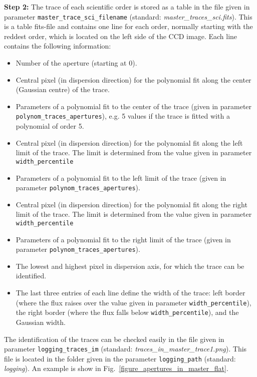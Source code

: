 \documentclass[10pt,a4paper]{article}
\begin{document}
\vspace{0.5em}\noindent \textbf{Step 2:} The trace of each scientific order is stored as a table in the file given in parameter \verb|master_trace_sci_filename| (standard: \textit{master\_traces\_sci.fits}). This is a table fits-file and contains one line for each order, normally starting with the reddest order, which is located on the left side of the CCD image. Each line contains the following information:
\begin{itemize}\setlength\itemsep{0em}
  \item Number of the aperture (starting at 0).
  \item Central pixel (in dispersion direction) for the polynomial fit along the center (Gaussian centre) of the trace.
  \item Parameters of a polynomial fit to the center of the trace (given in parameter \verb|polynom_traces_apertures|), e.g. 5 values if the trace is fitted with a polynomial of order 5.
  \item Central pixel (in dispersion direction) for the polynomial fit along the left limit of the trace. The limit is determined from the value given in parameter \verb|width_percentile|
  \item Parameters of a polynomial fit to the left limit of the trace (given in parameter \verb|polynom_traces_apertures|).
  \item Central pixel (in dispersion direction) for the polynomial fit along the right limit of the trace. The limit is determined from the value given in parameter \verb|width_percentile|
  \item Parameters of a polynomial fit to the right limit of the trace (given in parameter \verb|polynom_traces_apertures|).
  \item The lowest and highest pixel in dispersion axis, for which the trace can be identified.
  \item The last three entries of each line define the width of the trace: left border (where the flux raises over the value given in parameter \verb|width_percentile|), the right border (where the flux falls below \verb|width_percentile|), and the Gaussian width.
\end{itemize}
The identification of the traces can be checked easily in the file given in parameter \verb|logging_traces_im| (standard: \textit{traces\_in\_master\_trace1.png}). This file is located in the folder given in the parameter \verb|logging_path| (standard: \textit{logging}). An example is show in Fig.~\ref{figure_apertures_in_master_flat}.
\end{document}
